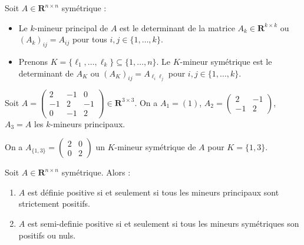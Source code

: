 \begin{definition}
Soit $A\in \mathbf{R}^{n\times n}$ symétrique :
\begin{itemize}
\item Le $k$-mineur principal de $A$ est le determinant de la matrice $A_{k}\in \mathbf{R}^{k\times k}$ ou $(A_{k})_{ij}=A_{ij}$ pour tous $i,j\in \{ 1,\dots,k \}$.
\item Prenons $K=\{ \ell_{1},\dots,\ell _{k} \}\subseteq \{ 1,\dots,n \}$. Le $K$-mineur symétrique est le determinant de $A_{K}$ ou $(A_{K})_{ij}=A_{\ell _{i}\ell _{j}}$ pour $i,j\in \{ 1,\dots,k \}$.
\end{itemize}
\end{definition}
\begin{example}
Soit $A=\begin{pmatrix}2 & -1 & 0 \\ -1 & 2 & -1 \\ 0 & -1 & 2\end{pmatrix}\in \mathbf{R}^{3\times  3}$. On a $A_{1}=(1)$, $A_{2}=\begin{pmatrix}2 & -1 \\ -1 & 2\end{pmatrix}$, $A_{3}=A$ les $k$-mineurs principaux.

On a $A_{\{ 1,3 \}}=\begin{pmatrix}2 & 0 \\ 0 & 2\end{pmatrix}$ un $K$-mineur symétrique de $A$ pour $K=\{ 1,3 \}$.
\end{example}
\begin{theorem}
Soit $A\in \mathbf{R}^{n\times n}$ symétrique. Alors :
\begin{enumerate}
\item $A$ est définie positive si et seulement si tous les mineurs principaux sont strictement positifs.
\item $A$ est semi-definie positive si et seulement si tous les mineurs symétriques son positifs ou nuls.
\end{enumerate}
\end{theorem}
